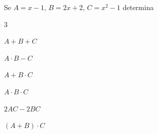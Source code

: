 
\begin{esercizio}
\label{ese:10.34}
Se \(A=x-1\), \(B=2x+2\), \(C=x^2-1\) determina
\begin{htmulticols}{3}
\begin{enumeratea}
\item \(A+B+C\)
\item \(A\cdot B-C\)
\item \(A+B\cdot C\)
\item \(A\cdot B\cdot C\)
\item \(2AC-2BC\)
\item \((A+B)\cdot C\)
\end{enumeratea}
\end{htmulticols}
\end{esercizio}

